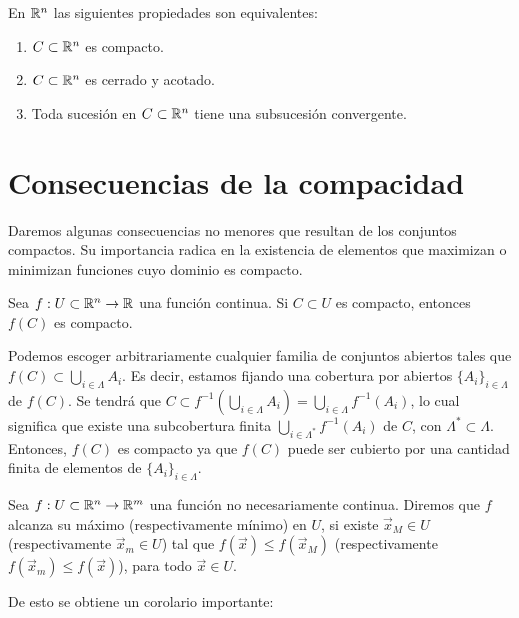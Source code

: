 \begin{proposicion}
En $\mathbb{R}^n$ las siguientes propiedades son equivalentes:
\begin{enumerate}
\item $C\subset \mathbb{R}^n$ es compacto.
\item $C\subset \mathbb{R}^n$ es cerrado y acotado.
\item Toda sucesi\'on en $C\subset \mathbb{R}^n$ tiene una subsucesi\'on convergente.
\end{enumerate}
\end{proposicion}

\section{Consecuencias de la compacidad}

Daremos algunas consecuencias no menores que resultan de los conjuntos compactos. Su importancia radica en la existencia de elementos que maximizan o minimizan funciones cuyo dominio es compacto.

\begin{teorema}
Sea $f:U\subset \mathbb{R}^n \to \mathbb{R}$ una funci\'on continua. Si $C\subset U$ es compacto, entonces $f(C)$ es compacto. 
\end{teorema}

\begin{demostracion} Podemos escoger arbitrariamente cualquier familia de conjuntos abiertos tales que $f(C)\subset \bigcup_{i \in \Lambda} A_i$. Es decir, estamos fijando una cobertura por abiertos $\{A_i\}_{i \in \Lambda}$ de $f(C)$. Se tendr\'a que $C\subset f^{-1} \left(\bigcup_{i \in \Lambda} A_i\right)=\bigcup_{i \in \Lambda} f^{-1}(A_i)$, lo cual significa que existe una subcobertura finita $\bigcup_{i\in \Lambda^*} f^{-1}(A_i)$ de $C$, con $\Lambda^* \subset \Lambda$. Entonces, $f(C)$ es compacto ya que $f(C)$ puede ser cubierto por una cantidad finita de elementos de $\{A_i\}_{i \in \Lambda}$. 
\end{demostracion}

\begin{definicion}
Sea $f: U\subset \mathbb{R}^n \to \mathbb{R}^m$ una funci\'on no necesariamente continua. Diremos que $f$ alcanza su m\'aximo (respectivamente m\'inimo) en $U$, si existe $\vec{x}_M \in U$ (respectivamente $\vec{x}_m \in U$) tal que $f(\vec{x})\leq f(\vec{x}_M)$ (respectivamente $f(\vec{x}_m)\leq f(\vec{x})$), para todo $\vec{x} \in U$. 
\end{definicion}

De esto se obtiene un corolario importante:


